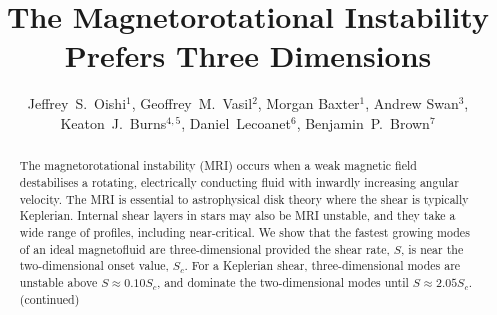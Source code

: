 \documentclass[openacc]{rsproca_new}%
\begin{document}
\title{The Magnetorotational Instability Prefers Three Dimensions}

\author{%
Jeffrey~S.~Oishi$^{1}$, Geoffrey~M.~Vasil$^{2}$, Morgan Baxter$^{1}$,
Andrew Swan$^{3}$, Keaton~J.~Burns$^{4,5}$, Daniel~Lecoanet$^6$, Benjamin~P.~Brown$^7$}

\address{$^{1}$Bates College Department of Physics and Astronomy, Lewiston, ME 04240, USA\\
$^{2}$University of Sydney School of Mathematics and Statistics, Sydney, NSW, Australia\\
$^{3}$Statistical Laboratory, DPMMS, University of Cambridge, Cambridge,
UK\\
$^{4}5$Center for Computational Astrophysics, Flatiron Institute, New York, NY 10010, USA\\
$^{5}$Massachusetts Institute of Technology Department of Physics, Cambridge, MA 02139, USA\\
$^{6}$Princeton University Department of Astrophysical Sciences, Princeton, NJ 08544, USA\\
$^{7}$University of Colorado Department of Astrophysical and Planetary Sciences, Boulder, CO 80309, USA}

\begin{abstract}
The magnetorotational instability (MRI) occurs when a weak magnetic field destabilises a rotating, electrically conducting fluid with inwardly increasing angular velocity.
The MRI is essential to astrophysical disk theory where the shear is typically Keplerian.
Internal shear layers in stars may also be MRI unstable, and they take a wide range of profiles, including near-critical.
We show that the fastest growing modes of an ideal magnetofluid are three-dimensional provided the shear rate, $S$, is near the two-dimensional onset value, $S_c$.
For a Keplerian shear, three-dimensional modes are unstable above $S\approx0.10S_c$, and dominate the two-dimensional modes until $S\approx2.05S_{c}$.
(continued)
\end{abstract}

\maketitle
\end{document}
